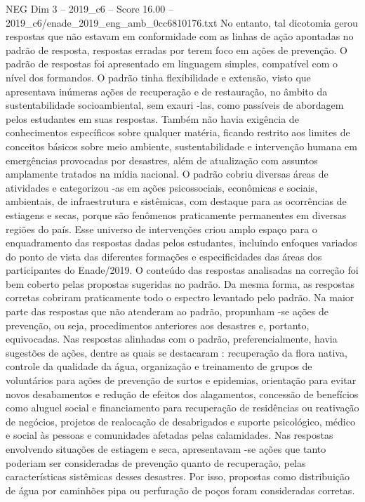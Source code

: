 \begin{textsample}{NEG Dim 3 – 2019\_c6 – Score 16.00 – 2019\_c6/enade\_2019\_eng\_amb\_0cc6810176.txt}
No entanto, tal dicotomia gerou respostas que não estavam em conformidade com as linhas de ação apontadas no padrão de resposta, respostas erradas por terem foco em ações de prevenção.
O padrão de respostas foi apresentado em linguagem simples, compatível com o nível dos formandos.
O padrão tinha flexibilidade e extensão, visto que apresentava inúmeras ações de recuperação e de restauração, no âmbito da sustentabilidade socioambiental, sem exauri -las, como passíveis de abordagem pelos estudantes em suas respostas.
Também não havia exigência de conhecimentos específicos sobre qualquer matéria, ficando restrito aos limites de conceitos básicos sobre meio ambiente, sustentabilidade e intervenção humana em emergências provocadas por desastres, além de atualização com assuntos amplamente tratados na mídia nacional.
O padrão cobriu diversas áreas de atividades e categorizou -as em ações psicossociais, econômicas e sociais, ambientais, de infraestrutura e sistêmicas, com destaque para as ocorrências de estiagens e secas, porque são fenômenos praticamente permanentes em diversas regiões do país.
Esse universo de intervenções criou amplo espaço para o enquadramento das respostas dadas pelos estudantes, incluindo enfoques variados do ponto de vista das diferentes formações e especificidades das áreas dos participantes do Enade/2019.
O conteúdo das respostas analisadas na correção foi bem coberto pelas propostas sugeridas no padrão.
Da mesma forma, as respostas corretas cobriram praticamente todo o espectro levantado pelo padrão.
Na maior parte das respostas que não atenderam ao padrão, propunham -se ações de prevenção, ou seja, procedimentos anteriores aos desastres e, portanto, equivocadas.
Nas respostas alinhadas com o padrão, preferencialmente, havia sugestões de ações, dentre as quais se destacaram : recuperação da flora nativa, controle da qualidade da água, organização e treinamento de grupos de voluntários para ações de prevenção de surtos e epidemias, orientação para evitar novos desabamentos e redução de efeitos dos alagamentos, concessão de benefícios como aluguel social e financiamento para recuperação de residências ou reativação de negócios, projetos de realocação de desabrigados e suporte psicológico, médico e social às pessoas e comunidades afetadas pelas calamidades.
Nas respostas envolvendo situações de estiagem e seca, apresentavam -se ações que tanto poderiam ser consideradas de prevenção quanto de recuperação, pelas características sistêmicas desses desastres.
Por isso, propostas como distribuição de água por caminhões pipa ou perfuração de poços foram consideradas corretas.

\end{textsample}
